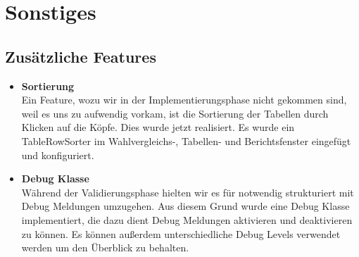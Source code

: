 \documentclass[12pt,a4paper,titlepage]{article}
\begin{document}
\section{Sonstiges}

\subsection{Zusätzliche Features}
\begin{itemize}
\item{\bf{Sortierung}}\\
Ein Feature, wozu wir in der Implementierungsphase nicht gekommen sind, weil es uns zu aufwendig vorkam, ist die Sortierung der Tabellen durch Klicken auf die Köpfe. Dies wurde jetzt realisiert. Es wurde ein TableRowSorter im Wahlvergleichs-, Tabellen- und Berichtsfenster eingefügt und konfiguriert.\\

\item{\bf{Debug Klasse}}\\
Während der Validierungsphase hielten wir es für notwendig strukturiert mit Debug Meldungen umzugehen. Aus diesem Grund wurde eine Debug Klasse implementiert, die dazu dient Debug Meldungen aktivieren und deaktivieren zu können. Es können außerdem unterschiedliche Debug Levels verwendet werden um den Überblick zu behalten.

\end{itemize}
\end{document}
